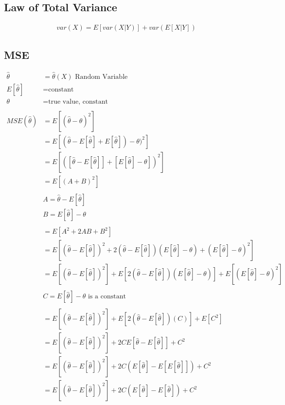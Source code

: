 \documentclass[]{book}
\begin{document}
\subsection {Law of Total Variance}
\begin{align}
var(X) = E[ var(X|Y) ] + var( E[X|Y] )
\end{align}

\subsection{MSE}

\begin{align}
	\hat{\theta} &= \hat{\theta}(X) \text{ Random Variable}\\
	E[\hat{\theta}] &= \text{constant}\\
	\theta &= \text{true value, constant}\\
	\\
	MSE(\hat{\theta}) &= E[(\hat{\theta} - \theta)^2]\\
	&= E[(\hat{\theta} - E[\hat{\theta}] + E[\hat{\theta}]) - \theta)^2]\\
	&= E[([\hat{\theta} - E[\hat{\theta}]] + [E[\hat{\theta}] - \theta])^2]\\
	&= E[(A + B)^2]\\
	\\
	& A = \hat{\theta} - E[\hat{\theta}]\\
	& B = E[\hat{\theta}] - \theta\\
	\\
	&= E[A^2 + 2AB + B^2]\\
	&= E[(\hat{\theta} - E[\hat{\theta}])^2 + 2(\hat{\theta} - E[\hat{\theta}])(E[\hat{\theta}] - \theta) + (E[\hat{\theta}] - \theta)^2]\\
	&= E[(\hat{\theta} - E[\hat{\theta}])^2] + E[2(\hat{\theta} - E[\hat{\theta}])(E[\hat{\theta}] - \theta)] + E[(E[\hat{\theta}] - \theta)^2]\\
	\\	
	& C = E[\hat{\theta}]  - \theta \text{ is a constant}\\
	\\
	&= E[(\hat{\theta} - E[\hat{\theta}])^2] + E[2(\hat{\theta} - E[\hat{\theta}])(C)] + E[C^2]\\
	&= E[(\hat{\theta} - E[\hat{\theta}])^2] + 2CE[\hat{\theta} - E[\hat{\theta}]] + C^2\\
	&= E[(\hat{\theta} - E[\hat{\theta}])^2] + 2C(E[\hat{\theta}] - E[E[\hat{\theta}]]) + C^2\\
	&= E[(\hat{\theta} - E[\hat{\theta}])^2] + 2C(E[\hat{\theta}] - E[\hat{\theta}]) + C^2\\	

\end{align}
\end{document}
